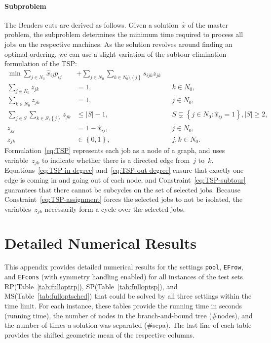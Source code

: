 \documentclass[a4paper,10pt]{article}
\newcommand{\setting}[1]{\texttt{#1}}
\newcommand{\fixed}[1]{\hat{ #1 }}
\newcommand{\rectanglepack}{RP\xspace}
\newcommand{\spherepack}{SP\xspace}
\newcommand{\scheduling}{MS\xspace}
\newcommand{\brackets}[1]{\left\{ #1 \right\}}
\theoremstyle{definition}
\begin{document}
\paragraph{Subproblem}
The Benders cuts are derived as follows.
Given a solution~$\fixed{x}$ of the master problem, the subproblem determines the minimum time required to process all jobs on the respective machines.
As the solution revolves around finding an optimal ordering, we can use a slight variation of the subtour elimination formulation of the TSP:
\begin{subequations}
  \label{eq:TSP}
  \begin{align}
    \min \sum_{j\in N_0} \fixed{x}_{ij} p_{ij} &+ \sum_{j\in N_0} \sum_{k\in N_0 \setminus\brackets{j}} s_{ijk} z_{jk} \nonumber\\
    \sum_{j\in N_0} z_{jk} &= 1, && k\in N_0, 
    \label{eq:TSP-in-degree}\\
    \sum_{k\in N_0} z_{jk} &= 1, && j\in N_0, \label{eq:TSP-out-degree}\\
    \sum_{j\in S} \sum_{k\in S\setminus\brackets{j}} z_{jk} &\leq |S| -1, && S\subsetneq \brackets{j\in N_0: \fixed{x}_{ij} = 1}, |S| \geq 2, \label{eq:TSP-subtour} \\
    z_{jj} &= 1 - \fixed{x}_{ij}, && j\in N_0, \label{eq:TSP-assignment} \\
    z_{jk} &\in \brackets{0, 1}, && j, k\in N_0.
  \end{align}
\end{subequations}
Formulation~\eqref{eq:TSP} represents each job as a node of a graph, and uses variable~$z_{jk}$ to indicate whether there is a directed edge from~$j$ to~$k$.
Equations~\eqref{eq:TSP-in-degree} and~\eqref{eq:TSP-out-degree} ensure that exactly one edge is coming in and going out of each node, and Constraint~\eqref{eq:TSP-subtour} guarantees that there cannot be subcycles on the set of selected jobs.
Because Constraint~\eqref{eq:TSP-assignment} forces the selected jobs to not be isolated, the variables~$z_{jk}$ necessarily form a cycle over the selected jobs.

\section{Detailed Numerical Results}
\label{app:detailedresults}

This appendix provides detailed numerical results for the settings \setting{pool}, \setting{EFrow}, and \setting{EFcons} (with symmetry handling enabled) for all instances of the test sets \rectanglepack (Table~\ref{tab:fulloptrp}), \spherepack (Table~\ref{tab:fulloptsp}), and \scheduling (Table~\ref{tab:fulloptsched}) that could be solved by all three settings within the time limit.
For each instance, these tables provide the running time in seconds (running time), the number of nodes in the branch-and-bound tree (\#nodes), and the number of times a solution was separated (\#sepa).
The last line of each table provides the shifted geometric mean of the respective columns.
\end{document}
